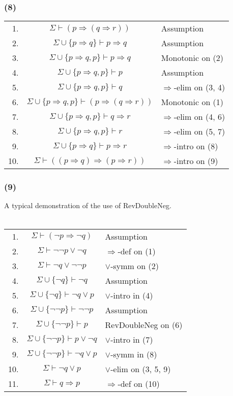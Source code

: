 \documentclass{article}
\begin{document}
\subsubsection*{(8)}
\begin{tabular}{r c l}
    1. & $\Sigma\vdash(p\Rightarrow(q\Rightarrow r))$ & Assumption\\
    2. & $\Sigma\cup\{p\Rightarrow q\}\vdash p\Rightarrow q$ & Assumption\\
    3. & $\Sigma\cup\{p\Rightarrow q, p\}\vdash p\Rightarrow q$ & Monotonic on (2)\\
    4. & $\Sigma\cup\{p\Rightarrow q, p\}\vdash p$ & Assumption\\
    5. & $\Sigma\cup\{p\Rightarrow q, p\}\vdash  q$ & $\Rightarrow$-elim on (3, 4)\\
    6. & $\Sigma\cup\{p\Rightarrow q, p\}\vdash  (p\Rightarrow(q\Rightarrow r))$ & Monotonic on (1)\\
    7. & $\Sigma\cup\{p\Rightarrow q, p\}\vdash  q\Rightarrow r$ &$\Rightarrow$-elim on (4, 6)\\
    8. & $\Sigma\cup\{p\Rightarrow q, p\}\vdash  r$ &$\Rightarrow$-elim on (5, 7)\\
    9. & $\Sigma\cup\{p\Rightarrow q\}\vdash  p\Rightarrow r$ &$\Rightarrow$-intro on (8)\\
    10. & $\Sigma\vdash  ((p\Rightarrow q)\Rightarrow (p\Rightarrow r))$ &$\Rightarrow$-intro on (9)\\
\end{tabular}
\subsubsection*{(9)}
A typical demonstration of the use of RevDoubleNeg.\\
\\
\begin{tabular}{r c l}
    1. & $\Sigma\vdash(\lnot p\Rightarrow \lnot q)$ & Assumption\\
    2. & $\Sigma\vdash \lnot\lnot p\lor \lnot q$ & $\Rightarrow$-def on (1)\\
    3. & $\Sigma\vdash \lnot q\lor \lnot\lnot p$ & $\lor$-symm on (2)\\
    4. & $\Sigma\cup\{\lnot q\}\vdash \lnot q$ & Assumption\\
    5. & $\Sigma\cup\{\lnot q\}\vdash \lnot q\lor p$ & $\lor$-intro in (4)\\
    6. & $\Sigma\cup\{\lnot\lnot p\}\vdash  \lnot\lnot p$ & Assumption\\
    7. & $\Sigma\cup\{\lnot\lnot p\}\vdash   p$ & RevDoubleNeg on (6)\\
    8. & $\Sigma\cup\{\lnot\lnot p\}\vdash   p\lor\lnot q$ & $\lor$-intro in (7)\\
    9. & $\Sigma\cup\{\lnot\lnot p\}\vdash   \lnot q\lor p$ & $\lor$-symm in (8)\\
    10. & $\Sigma\vdash  \lnot q\lor p$ & $\lor$-elim on (3, 5, 9)\\
    11. & $\Sigma\vdash  q\Rightarrow p$ & $\Rightarrow$-def on (10)\\
\end{tabular}
\end{document}

